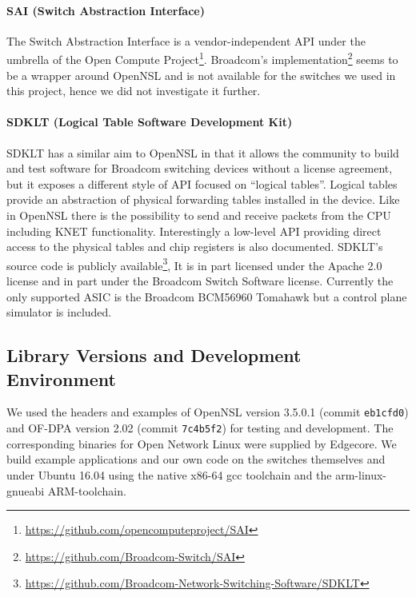 \documentclass[a4paper]{article}
\begin{document}
\paragraph{SAI (Switch Abstraction Interface)}
The Switch Abstraction Interface is a vendor-independent API under the umbrella of the Open Compute Project\footnote{\url{https://github.com/opencomputeproject/SAI}}. Broadcom's implementation\footnote{\url{https://github.com/Broadcom-Switch/SAI}} seems to be a wrapper around OpenNSL and is not available for the switches we used in this project, hence we did not investigate it further.

\paragraph{SDKLT (Logical Table Software Development Kit)}
SDKLT has a similar aim to OpenNSL in that it allows the community to build and test software for Broadcom switching devices without a license agreement, but it exposes a different style of API focused on ``logical tables''. Logical tables provide an abstraction of physical forwarding tables installed in the device. Like in OpenNSL there is the possibility to send and receive packets from the CPU including KNET functionality. Interestingly a low-level API providing direct access to the physical tables and chip registers is also documented. SDKLT's source code is publicly available\footnote{\url{https://github.com/Broadcom-Network-Switching-Software/SDKLT}}, It is in part licensed under the Apache 2.0 license and in part under the Broadcom Switch Software license. Currently the only supported ASIC is the Broadcom BCM56960 Tomahawk but a control plane simulator is included.

\subsection{Library Versions and Development Environment}
We used the headers and examples of OpenNSL version 3.5.0.1 (commit \texttt{eb1cfd0}) and OF-DPA version 2.02 (commit \texttt{7c4b5f2}) for testing and development. The corresponding binaries for Open Network Linux were supplied by Edgecore. We build example applications and our own code on the switches themselves and under Ubuntu 16.04 using the native x86-64 gcc toolchain and the arm-linux-gnueabi ARM-toolchain.

\end{document}
